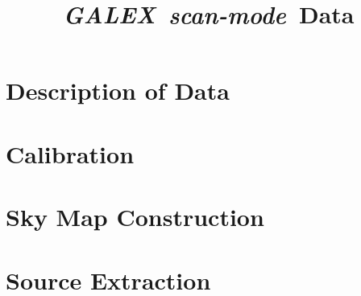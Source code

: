 \documentclass[12pt, preprint]{aastex}
\begin{document}
\newcommand{\project}[1]{\textsl{#1}} 
\newcommand{\galex}{\project{GALEX}}
\newcommand{\scanmode}{\project{scan-mode}}

\title{\galex\ \scanmode\ Data}
\author{}

\section{Description of Data}

\section{Calibration}

\section{Sky Map Construction}

\section{Source Extraction}
\end{document}
